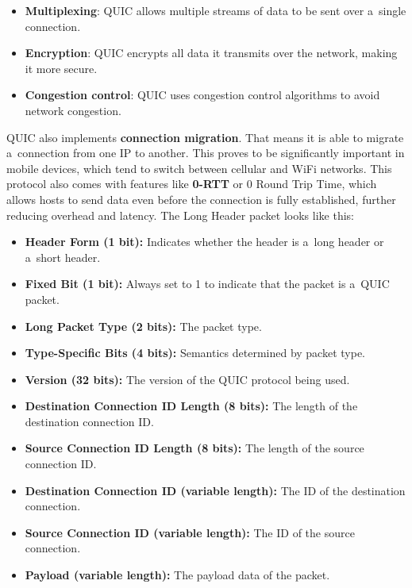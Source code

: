 \documentclass[
  printed,     %
  color,       %
  oneside,     %
  nosansbold,  %
  nocolorbold, %
  nolof,         %
  nolot,         %
]{fithesis4}
\begin{document}
\begin{itemize}
    \item \textbf{Multiplexing}: QUIC allows multiple streams of data to be sent over a~single connection.
    \item \textbf{Encryption}: QUIC encrypts all data it transmits over the network, making it more secure.
    \item \textbf{Congestion control}: QUIC uses congestion control algorithms to avoid network congestion.
\end{itemize}

QUIC also implements \textbf{connection migration}. That means it is able to migrate a~connection from one IP to another. This proves to be significantly important in mobile devices, which tend to switch between cellular and WiFi networks. This protocol also comes with features like \textbf{0-RTT} or 0 Round Trip Time, which allows hosts to send data even before the connection is fully established, further reducing overhead and latency. The Long Header packet looks like this:

\begin{itemize}[noitemsep,topsep=0pt]
    \item \textbf{Header Form (1 bit):} Indicates whether the header is a~long header or a~short header.
    \item \textbf{Fixed Bit (1 bit):} Always set to 1 to indicate that the packet is a~QUIC packet.
    \item \textbf{Long Packet Type (2 bits):} The packet type.
    \item \textbf{Type-Specific Bits (4 bits):} Semantics determined by packet type.
    \item \textbf{Version (32 bits):} The version of the QUIC protocol being used.
    \item \textbf{Destination Connection ID Length (8 bits):} The length of the destination connection ID.
    \item \textbf{Source Connection ID Length (8 bits):} The length of the source connection ID.
    \item \textbf{Destination Connection ID (variable length):} The ID of the destination connection.
    \item \textbf{Source Connection ID (variable length):} The ID of the source connection.
    
    \item \textbf{Payload (variable length):} The payload data of the packet.
\end{itemize}
\end{document}
